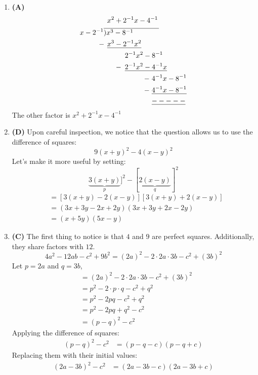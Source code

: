 \begin{multicols}{2}
\begin{enumerate}[label={\textbf{\arabic*.}}]
\item \textbf{(A)}
\begin{align*}
& \hspace{5pt} x^ 2 + 2^{-1}x -4^{-1} \\ \vspace{-20pt}
x - 2^{-1}& \overline{)x^3 - 8^{-1} \hspace{.5in}} \\
-\hspace{-1pt} & \hspace{5pt} \underline{x^3 - 2^{-1}x^2} \\
& \hspace{30pt} 2^{-1}x^2 - 8^{-1} \\
-\hspace{-25pt} & \hspace{30pt} \underline{2^{-1}x^2 - 4^{-1}x} \\
-\hspace{-65pt} & \hspace{68pt} 4^{-1}x - 8^{-1} \\
-\hspace{-65pt} & \hspace{68pt} \underline{4^{-1}x - 8^{-1} } \\
& \hspace{68pt} \underline{-----}
\end{align*}
The other factor is $x^ 2 + 2^{-1}x -4^{-1}$

\item \textbf{(D)} Upon careful inspection, we notice that the question allows us to use the difference of squares:
\[9(x + y)^2 - 4(x - y)^2\]
Let's make it more useful by setting:
\[\underbrace{3(x + y)}_{p}]^2 - [\underbrace{2(x - y)}_{q}]^2\]
\begin{align*}
& = \left[3(x + y) - 2(x - y)\right]\left[3(x + y) + 2(x - y)\right] \\
& = \left(3x + 3y - 2x + 2y\right)\left(3x + 3y + 2x - 2y\right) \\
& = (x + 5y)(5x - y)
\end{align*}


\item \textbf{(C)} The first thing to notice is that \(4\) and \(9\) are perfect squares. Additionally, they share factors with \(12\).
\[4a^2 - 12ab - c^2 + 9b^2 = (2a)^2 - 2 \cdot 2a \cdot 3b - c^2 + (3b)^2\]
Let \(p = 2a\) and \(q = 3b\),
\begin{align*}
&= (2a)^2 - 2 \cdot 2a \cdot 3b - c^2 + (3b)^2 \\
&= p^2 - 2 \cdot p \cdot q - c^2 + q^2 \\
&= p^2 - 2pq - c^2 + q^2 \\
&= p^2 - 2pq + q^2 - c^2 \\
&= (p - q)^2 - c^2
\end{align*}
Applying the difference of squares:
\begin{align*}
(p - q)^2 - c^2 &= (p - q - c)(p - q + c)
\end{align*}
Replacing them with their initial values:
\begin{align*}
(2a - 3b)^2 - c^2 &= (2a - 3b - c)(2a - 3b + c)
\end{align*}


\end{enumerate}
\end{multicols}
